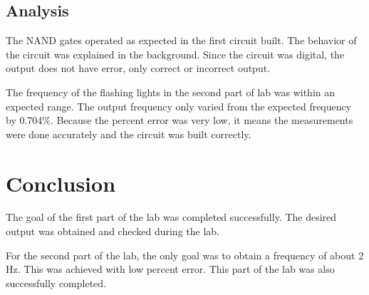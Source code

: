 \documentclass[twocolumn, amsmath]{revtex4}
\begin{document}
\subsection{Analysis}

The NAND gates operated as expected in the first circuit built. The behavior of the circuit was explained in the background. Since the circuit was digital, the output does not have error, only correct or incorrect output.

The frequency of the flashing lights in the second part of lab was within an expected range. The output frequency only varied from the expected frequency by 0.704\%. Because the percent error was very low, it means the measurements were done accurately and the circuit was built correctly.


\section{Conclusion}

The goal of the first part of the lab was completed successfully. The desired output was obtained and checked during the lab.

For the second part of the lab, the only goal was to obtain a frequency of about 2 Hz. This was achieved with low percent error. This part of the lab was also successfully completed.
\end{document}

